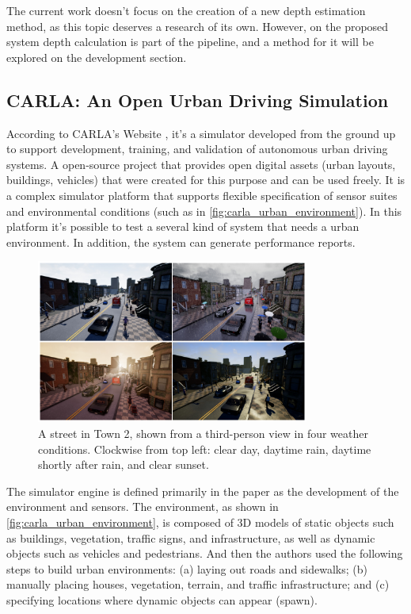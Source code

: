     The current work doesn't focus on the creation of a new depth estimation method, as this topic deserves a research of its own. However, on the proposed system depth calculation is part of the pipeline, and a method for it will be explored on the development section.

\subsection{CARLA: An Open Urban Driving Simulation}

    According to CARLA's Website \cite{carla-official-website}, it's a simulator developed from the ground up to support development, training, and validation of autonomous urban driving systems. A open-source project that provides open digital assets (urban layouts, buildings, vehicles) that were created for this purpose and can be used freely. It is a complex simulator platform that supports flexible specification of sensor suites and environmental conditions (such as in \autoref{fig:carla_urban_environment}). In this platform it's possible to test a several kind of system that needs a urban environment. In addition, the system can generate performance reports.
    
    \begin{figure}[H]
     \caption{\label{fig:carla_urban_environment}
A street in Town 2, shown from a third-person view in four weather conditions. Clockwise from top left: clear day, daytime rain, daytime shortly after rain, and clear sunset.}
     \begin{center}
        \includegraphics[width=0.8\textwidth]{images/urban_environment.png}
     \end{center}
    \end{figure}
    
    The simulator engine is defined primarily in the paper \cite{Dosovitskiy17} as the development of the environment and sensors. The environment, as shown in \autoref{fig:carla_urban_environment}, is composed of 3D models of static objects such as buildings, vegetation, traffic signs, and infrastructure, as well as dynamic objects such as vehicles and pedestrians. And then the authors used the following steps to build urban environments: (a) laying out roads and sidewalks; (b) manually placing houses, vegetation, terrain, and traffic infrastructure; and (c) specifying locations where dynamic objects can appear (spawn).
    
